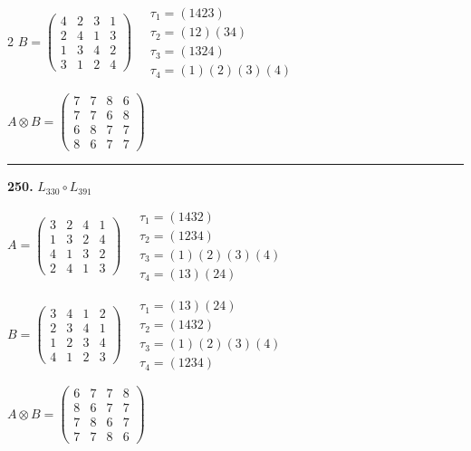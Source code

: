 \begin{multicols}{2}
$B = \begin{pmatrix} 4 & 2 & 3 & 1 \\ 2 & 4 & 1 & 3 \\ 1 & 3 & 4 & 2 \\ 3 & 1 & 2 & 4 \end{pmatrix} \quad \begin{matrix} \tau_{1}=(1 4 2 3) \\ \tau_{2}=(1 2)(3 4) \\ \tau_{3}=(1 3 2 4) \\ \tau_{4}=(1)(2)(3)(4) \end{matrix}$

$A \otimes B = \begin{pmatrix} 7 & 7 & 8 & 6 \\ 7 & 7 & 6 & 8 \\ 6 & 8 & 7 & 7 \\ 8 & 6 & 7 & 7 \end{pmatrix}$

\vspace{0.3em}
\hrule
\vspace{0.3em}

\noindent\textbf{250.} $L_{330} \circ L_{391}$

$A = \begin{pmatrix} 3 & 2 & 4 & 1 \\ 1 & 3 & 2 & 4 \\ 4 & 1 & 3 & 2 \\ 2 & 4 & 1 & 3 \end{pmatrix} \quad \begin{matrix} \tau_{1}=(1 4 3 2) \\ \tau_{2}=(1 2 3 4) \\ \tau_{3}=(1)(2)(3)(4) \\ \tau_{4}=(1 3)(2 4) \end{matrix}$

$B = \begin{pmatrix} 3 & 4 & 1 & 2 \\ 2 & 3 & 4 & 1 \\ 1 & 2 & 3 & 4 \\ 4 & 1 & 2 & 3 \end{pmatrix} \quad \begin{matrix} \tau_{1}=(1 3)(2 4) \\ \tau_{2}=(1 4 3 2) \\ \tau_{3}=(1)(2)(3)(4) \\ \tau_{4}=(1 2 3 4) \end{matrix}$

$A \otimes B = \begin{pmatrix} 6 & 7 & 7 & 8 \\ 8 & 6 & 7 & 7 \\ 7 & 8 & 6 & 7 \\ 7 & 7 & 8 & 6 \end{pmatrix}$


\end{multicols}
